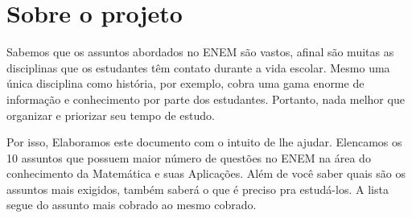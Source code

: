 \chapter*{Sobre o projeto}
Sabemos que os assuntos abordados no ENEM são vastos, afinal são muitas as disciplinas que os estudantes têm contato durante a vida escolar. Mesmo uma única disciplina como história, por exemplo, cobra uma gama enorme de informação e conhecimento por parte dos estudantes. Portanto, nada melhor que organizar e priorizar seu tempo de estudo.

\noindent Por isso, Elaboramos este documento com o intuito de lhe ajudar. Elencamos os 10 assuntos que possuem maior número de questões no ENEM na área do conhecimento da Matemática e suas Aplicações. Além de você saber quais são os assuntos mais exigidos, também saberá o que é preciso pra estudá-los. A lista segue do assunto mais cobrado ao mesmo cobrado.